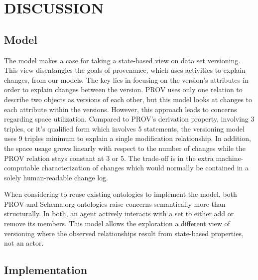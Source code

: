 
\chapter{DISCUSSION}

\section{Model}

The model makes a case for taking a state-based view on data set versioning.
This view disentangles the goals of provenance, which uses activities to explain changes, from our models.
The key lies in focusing on the version's attributes in order to explain changes between the version.
PROV uses only one relation to describe two objects as versions of each other, but this model looks at changes to each attribute within the versions.
However, this approach leads to concerns regarding space utilization.
Compared to PROV's derivation property, involving 3 triples, or it's qualified form which involves 5 statements, the versioning model uses 9 triples minimum to explain a single modification relationship.
In addition, the space usage grows linearly with respect to the number of changes while the PROV relation stays constant at 3 or 5.
The trade-off is in the extra machine-computable characterization of changes which would normally be contained in a solely human-readable change log.

When considering to reuse existing ontologies to implement the model, both PROV and Schema.org ontologies raise concerns semantically more than structurally.
In both, an agent actively interacts with a set to either add or remove its members.
This model allows the exploration a different view of versioning where the observed relationships result from state-based properties, not an actor.

\section{Implementation}

